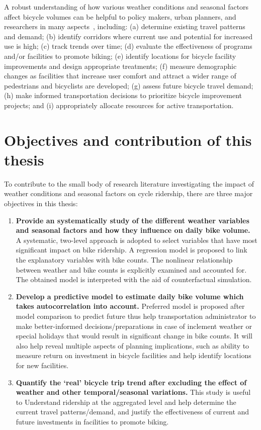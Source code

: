 \documentclass [11pt, proquest] {uwthesis}[2015/03/03]
\begin{document}
A robust understanding of how various weather conditions and seasonal factors affect bicycle volumes can be helpful to policy makers, urban planners, and researchers in many aspects~\cite{LAManual}, including: (a) determine existing travel patterns and demand; (b) identify corridors where current use and potential for increased use is high; (c) track trends over time; (d) evaluate the effectiveness of programs and/or facilities to promote biking; (e) identify locations for bicycle facility improvements and design appropriate treatments; (f) measure demographic changes as facilities that increase user comfort and attract a wider range of pedestrians and bicyclists are developed; (g) assess future bicycle travel demand; (h) make informed transportation decisions to prioritize bicycle improvement projects; and (i) appropriately allocate resources for active transportation.

\section{Objectives and contribution of this thesis}
To contribute to the small body of research literature investigating the impact of weather conditions and seasonal factors on cycle ridership, there are three major objectives in this thesis:
\begin{enumerate}
\item \textbf{Provide an systematically study of the different weather variables and seasonal factors and how they influence on daily bike volume.} A systematic, two-level approach is adopted to select variables that have most significant impact on bike ridership. A regression model is proposed to link the explanatory variables with bike counts. The nonlinear relationship between weather and bike counts is explicitly examined and accounted for. The obtained model is interpreted with the aid of counterfactual simulation. 
\item \textbf{Develop a predictive model to estimate daily bike volume which takes autocorrelation into account.} Preferred model is proposed after model comparison to predict future thus help transportation administrator to make better-informed decisions/preparations in case of inclement weather or special holidays that would result in significant change in bike counts. It will also help reveal multiple aspects of planning implications, such as ability to measure return on investment in bicycle facilities and help identify locations for new facilities. 
\item \textbf{Quantify the `real' bicycle trip trend after excluding the effect of weather and other temporal/seasonal variations.} This study is useful to Understand ridership at the aggregated level and help determine the current travel patterns/demand, and justify the effectiveness of current and future investments in facilities to promote biking.
\end{enumerate}
\end{document}
